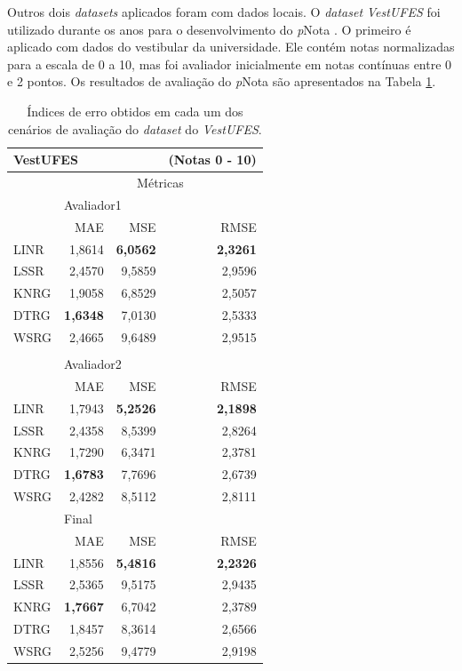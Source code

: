 Outros dois \textit{datasets} aplicados foram com dados locais. O \textit{dataset} \textit{VestUFES} foi utilizado durante os anos para o desenvolvimento do \textit{p}Nota \cite{spalenza2017}. O primeiro é aplicado com dados do vestibular da universidade. Ele contém notas normalizadas para a escala de 0 a 10, mas foi avaliador inicialmente em notas contínuas entre 0 e 2 pontos. Os resultados de avaliação do \textit{p}Nota são apresentados na Tabela \ref{tab-VEST}.

\begin{table}[!h]
\centering
\caption{Índices de erro obtidos em cada um dos cenários de avaliação do \textit{dataset} do \textit{VestUFES}.}
\label{tab-VEST}
\begin{tabular}{p{5cm} r r r }
    \hline
    \multicolumn{3}{l}{\textbf{VestUFES}} & (Notas 0 - 10) \\ \hline
     & \multicolumn{3}{c}{M{\'e}tricas} \\

    & \multicolumn{3}{l}{Avaliador1} \\ \cline{2-4}
     & MAE & MSE & RMSE \\
    LINR & 1,8614 & \textbf{6,0562} & \textbf{2,3261} \\
    LSSR & 2,4570 & 9,5859 & 2,9596 \\
    KNRG & 1,9058 & 6,8529 & 2,5057 \\
    DTRG & \textbf{1,6348} & 7,0130 & 2,5333 \\
    WSRG & 2,4665 & 9,6489 & 2,9515 \\
    \\
    & \multicolumn{3}{l}{Avaliador2} \\ \cline{2-4}
     & MAE & MSE & RMSE \\
    LINR & 1,7943 & \textbf{5,2526} & \textbf{2,1898} \\
    LSSR & 2,4358 & 8,5399 & 2,8264 \\
    KNRG & 1,7290 & 6,3471 & 2,3781 \\
    DTRG & \textbf{1,6783} & 7,7696 & 2,6739 \\
    WSRG & 2,4282 & 8,5112 & 2,8111 \\

    & \multicolumn{3}{l}{Final} \\ \cline{2-4}
     & MAE & MSE & RMSE \\
    LINR & 1,8556 & \textbf{5,4816} & \textbf{2,2326} \\
    LSSR & 2,5365 & 9,5175 & 2,9435 \\
    KNRG & \textbf{1,7667} & 6,7042 & 2,3789 \\
    DTRG & 1,8457 & 8,3614 & 2,6566 \\
    WSRG & 2,5256 & 9,4779 & 2,9198 \\

    \hline
    \hline
\end{tabular}
\end{table}

